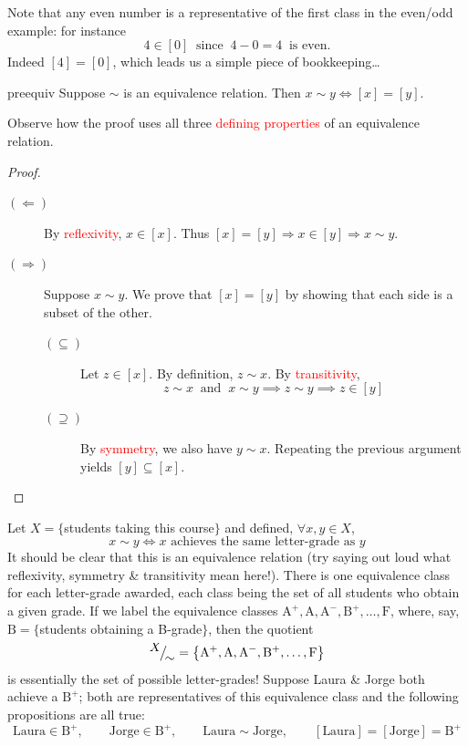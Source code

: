 Note that any even number is a representative of the first class in the even/odd example: for instance
\[
	4\in[0]\ \text{ since\ }\ 4-0=4\ \text{ is even.}
\]
Indeed $[4]=[0]$, which leads us a simple piece of bookkeeping\ldots


\begin{lemm}{}{preequiv}
	Suppose $\sim$ is an equivalence relation. Then $x\sim y\Longleftrightarrow [x]=[y]$.
\end{lemm}

Observe how the proof uses all three \textcolor{red}{defining properties} of an equivalence relation.

\begin{proof}
	\begin{description}
		\item[$(\Leftarrow)$] By \textcolor{red}{reflexivity}, $x\in[x]$. Thus $[x]=[y] \Longrightarrow x\in[y]\Longrightarrow x\sim y$.
		\item[$(\Rightarrow)$] Suppose $x\sim y$. We prove that $[x]=[y]$ by showing that each side is a subset of the other.
		\begin{description}
			\item[$(\subseteq)$] Let $z\in[x]$. By definition, $z\sim x$. By \textcolor{red}{transitivity},
			\[
				z\sim x\ \text{ and }\ x\sim y\implies z\sim y\implies z\in[y]
			\]
			\item[$(\supseteq)$] By \textcolor{red}{symmetry}, we also have $y\sim x$. Repeating the previous argument yields $[y]\subseteq [x]$.\qedhere
		\end{description}
	\end{description}
\end{proof}


\begin{example}{}{}
	Let $X=\{$students taking this course$\}$ and defined, $\forall x,y\in X$,
	\[
		x\sim y\iff x \text{ achieves the same letter-grade as $y$}
	\]
	It should be clear that this is an equivalence relation (try saying out loud what reflexivity, symmetry \& transitivity mean here!).	There is one equivalence class for each letter-grade awarded, each class being the set of all students who obtain a given grade. If we label the equivalence classes $\mathrm{A^+,A,A^-,B^+,\ldots,F}$, where, say, $\mathrm B=\{$students obtaining a B-grade$\}$, then the quotient
		\[
			\smash{{}^{\textstyle {X}}\!\big/_{\textstyle \!{\sim}}}=\bigl\{\mathrm{A^+,A,A^-,B^+,\ldots,F}\bigr\}
		\]
		is essentially the set of possible letter-grades!	Suppose Laura \& Jorge both achieve a $\mathrm{B^+}$; both are representatives of this equivalence class and the following propositions are all true:
		\[
			\text{Laura}\in \mathrm{B^+},\qquad \text{Jorge}\in\mathrm{B^+},\qquad \text{Laura}\sim\text{Jorge},\qquad [\text{Laura}]=[\text{Jorge}] =\mathrm{B^+}
		\] 
\end{example}


